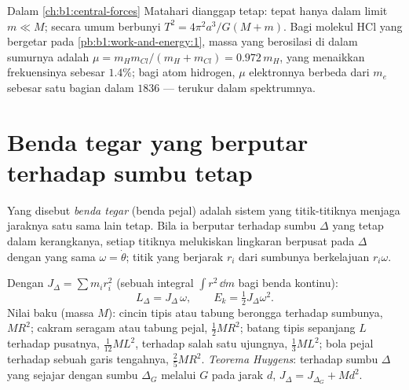 \begin{example}\label{ex:b1:systems-of-points:reduced}
Dalam \cref{ch:b1:central-forces} Matahari dianggap tetap: tepat hanya dalam
limit $m \ll M$; secara umum  berbunyi $T^2 = 4\pi^2a^3/G(M +
m)$. Bagi molekul HCl yang bergetar pada \cref{pb:b1:work-and-energy:1},
massa yang berosilasi di dalam sumurnya adalah $\mu = m_Hm_{Cl}/(m_H + m_{Cl}) =
0.972\,m_H$, yang menaikkan frekuensinya sebesar $1.4\%$; bagi atom
hidrogen, $\mu$ elektronnya berbeda dari $m_e$ sebesar satu bagian dalam $1836$ ---
terukur dalam spektrumnya.
\end{example}

\section{Benda tegar yang berputar terhadap sumbu tetap}

\begin{definition}\label{def:b1:systems-of-points:solid}
Yang disebut \emph{benda tegar} (benda pejal) adalah sistem yang titik-titiknya
menjaga jaraknya satu sama lain tetap. Bila ia berputar terhadap sumbu $\Delta$ yang tetap dalam kerangkanya, setiap
titiknya melukiskan lingkaran berpusat pada $\Delta$ dengan  yang sama
$\omega = \dot\theta$; titik yang berjarak $r_i$ dari sumbunya berkelajuan
$r_i\omega$.
\end{definition}

\begin{proposition}\label{prop:b1:systems-of-points:inertia}
Dengan \emph{} $J_\Delta = \sum m_ir_i^2$ (sebuah integral
$\int r^2\,\dd m$ bagi benda kontinu):
\[
L_\Delta = J_\Delta\,\omega, \qquad E_k = \tfrac12 J_\Delta\omega^2 .
\]
Nilai baku (massa $M$): cincin tipis atau tabung berongga terhadap sumbunya,
$MR^2$; cakram seragam atau tabung pejal, $\tfrac12 MR^2$; batang tipis
sepanjang $L$ terhadap pusatnya, $\tfrac{1}{12}ML^2$, terhadap salah satu ujungnya,
$\tfrac13 ML^2$; bola pejal terhadap sebuah garis tengahnya, $\tfrac25 MR^2$.
\emph{Teorema Huygens}: terhadap sumbu $\Delta$ yang sejajar dengan sumbu
$\Delta_G$ melalui $G$ pada jarak $d$, $J_\Delta = J_{\Delta_G} + Md^2$.
\end{proposition}

